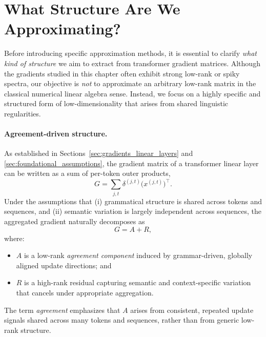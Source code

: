 \section{What Structure Are We Approximating?}
\label{sec:target_structure}

Before introducing specific approximation methods, it is essential to clarify
\emph{what kind of structure} we aim to extract from transformer gradient matrices.
Although the gradients studied in this chapter often exhibit strong low-rank or
spiky spectra, our objective is \emph{not} to approximate an arbitrary low-rank
matrix in the classical numerical linear algebra sense.
Instead, we focus on a highly specific and structured form of low-dimensionality
that arises from shared linguistic regularities.

\paragraph{Agreement-driven structure.}
As established in Sections~\ref{sec:gradients_linear_layers} and
\ref{sec:foundational_assumptions}, the gradient matrix of a transformer linear
layer can be written as a sum of per-token outer products,
\[
G = \sum_{j,t} \delta^{(j,t)} \bigl(x^{(j,t)}\bigr)^\top.
\]
Under the assumptions that (i) grammatical structure is shared across tokens and
sequences, and (ii) semantic variation is largely independent across sequences,
the aggregated gradient naturally decomposes as
\[
G = A + R,
\]
where:
\begin{itemize}
    \item $A$ is a low-rank \emph{agreement component} induced by grammar-driven,
    globally aligned update directions; and
    \item $R$ is a high-rank residual capturing semantic and context-specific
    variation that cancels under appropriate aggregation.
\end{itemize}

The term \emph{agreement} emphasizes that $A$ arises from consistent, repeated
update signals shared across many tokens and sequences, rather than from generic
low-rank structure.

